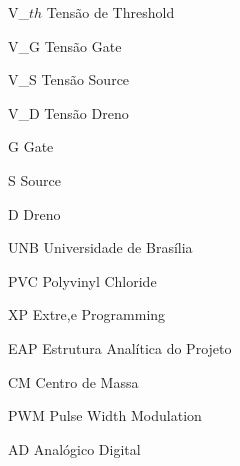 \begin{siglas}
  \item [V\_$th$] Tensão de Threshold
  \item [V\_G] Tensão Gate
  \item [V\_S] Tensão Source
  \item [V\_D] Tensão Dreno
  \item [G] Gate
  \item [S] Source
  \item [D] Dreno
  \item [UNB] Universidade de Brasília
  \item [PVC] Polyvinyl Chloride
  \item [XP] Extre,e Programming
  \item [EAP] Estrutura Analítica do Projeto
  \item [CM] Centro de Massa
  \item [PWM] Pulse Width Modulation
  \item [AD] Analógico Digital
\end{siglas}
